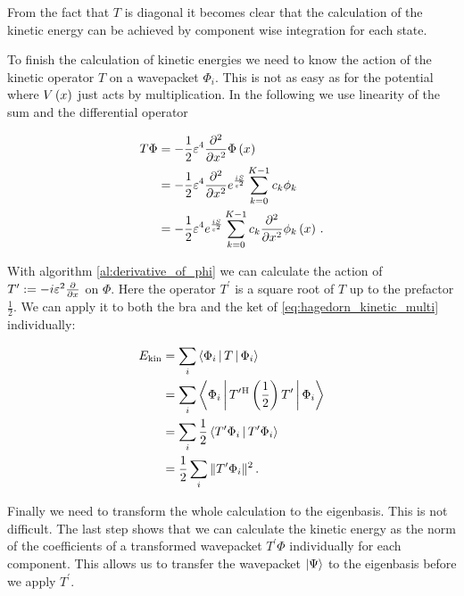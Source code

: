 From the fact that $T$ is diagonal it becomes clear that the calculation of the
kinetic energy can be achieved by component wise integration for each state.

To finish the calculation of kinetic energies we need to know the action of the
kinetic operator $T$ on a wavepacket $\Phi_i$. This is not as easy as for the
potential where $V\left( x \right)$ just acts by multiplication. In the following we use
linearity of the sum and the differential operator

\begin{equation}
\begin{split}
  T \Phi & = -\frac{1}{2}\varepsilon^4 \frac{\partial^2}{\partial x^2} \Phi\left( x \right) \\
         & = -\frac{1}{2}\varepsilon^4 \frac{\partial^2}{\partial x^2} e^{\frac{iS}{\varepsilon^2}} \sum_{k=0}^{K-1} c_k \phi_k \\
         & = -\frac{1}{2}\varepsilon^4 e^{\frac{iS}{\varepsilon^2}} \sum_{k=0}^{K-1} c_k  \frac{\partial^2}{\partial x^2} \phi_k\left( x \right) \,.
\end{split}
\end{equation}

With algorithm \ref{al:derivative_of_phi} we can calculate the action of $T^\prime := -i \varepsilon^2\frac{\partial}{\partial x}$
on $\Phi$. Here the operator $T^\prime$ is a square root of $T$ up to the prefactor
$\frac{1}{2}$. We can apply it to both the bra and the ket of \eqref{eq:hagedorn_kinetic_multi}
individually:

\begin{equation} \label{eq:kinetic_energy_eigen_homog}
\begin{split}
  E_{\text{kin}} & = \sum_i \Braket{\Phi_i | T | \Phi_i} \\
                 & = \sum_i \Braket{\Phi_i | T^\prime{}^{\textnormal{H}} \left(\frac{1}{2}\right) T^\prime | \Phi_i} \\
                 & = \sum_i \frac{1}{2} \Braket{ T^\prime \Phi_i | T^\prime \Phi_i} \\
                 & = \frac{1}{2} \sum_i \| T^\prime \Phi_i \|^2 \,.
\end{split}
\end{equation}

Finally we need to transform the whole calculation to the eigenbasis. This is not
difficult. The last step shows that we can calculate the kinetic energy as the norm
of the coefficients of a transformed wavepacket $T^\prime \Phi$ individually for
each component. This allows us to transfer the wavepacket $\Ket{\Psi}$ to the eigenbasis
before we apply $T^\prime$.

